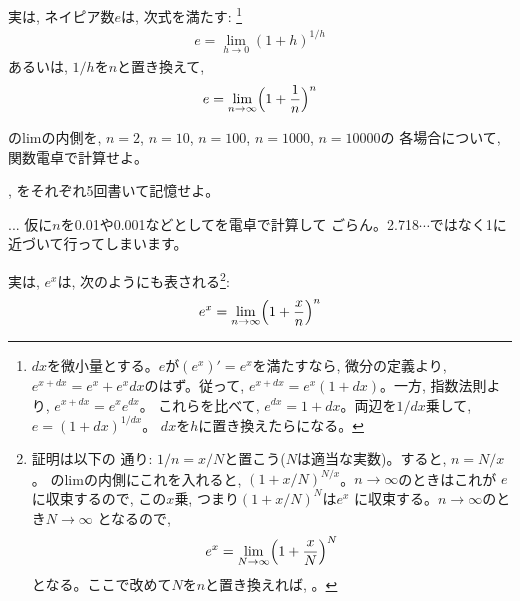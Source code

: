実は, ネイピア数$e$は, 次式を満たす:
\footnote{$dx$を微小量とする。$e$が$(e^x)'=e^x$を満たすなら, 
微分の定義より, $e^{x+dx}=e^x+e^xdx$のはず。従って, 
$e^{x+dx}=e^x(1+dx)$。一方, 指数法則より, $e^{x+dx}=e^xe^{dx}$。
これらを比べて, $e^{dx}=1+dx$。両辺を$1/dx$乗して, $e=(1+dx)^{1/dx}$。
$dx$を$h$に置き換えたらになる。}
\begin{eqnarray}
e=\lim_{ h \to 0} ( 1 + h)^{1/h}\label{eq:def_NapierNum0}
\end{eqnarray}
あるいは, $1/h$を$n$と置き換えて, 
\begin{eqnarray}
e=\lim_{n \to \infty} \Bigl( 1 + \frac{1}{n} \Bigr)^n\label{eq:def_NapierNum}
\end{eqnarray}

\begin{q}\label{q:exp_evalue} のlimの内側を, 
$n=2$, $n=10$, $n=100$, $n=1000$, $n=10000$の
各場合について, 関数電卓で計算せよ。
\end{q}

\begin{q}\label{q:def_NapierNum} , 
をそれぞれ5回書いて記憶せよ。\end{q}

\begin{freqmiss}{\small{} ... 
仮に$n$を0.01や0.001などとしてを電卓で計算して
ごらん。2.718$\cdots$ではなく1に近づいて行ってしまいます。}\end{freqmiss}


実は, $e^x$は, 次のようにも表される\footnote{証明は以下の
通り: $1/n=x/N$と置こう($N$は適当な実数)。すると, $n=N/x$。
のlimの内側にこれを入れると, 
$(1+x/N)^{N/x}$。$n\rightarrow\infty$のときはこれが
$e$に収束するので, この$x$乗, つまり$(1+x/N)^N$は$e^x$
に収束する。$n\rightarrow\infty$のとき$N\rightarrow\infty$
となるので, 
\begin{eqnarray*}
e^x=\lim_{N \to \infty} \Bigl( 1 + \frac{x}{N} \Bigr)^N
\end{eqnarray*}
となる。ここで改めて$N$を$n$と置き換えれば, 。}:
\begin{eqnarray}
e^x=\lim_{n \to \infty} \Bigl( 1 + \frac{x}{n} \Bigr)^n\label{eq:func_e_def}
\end{eqnarray}

